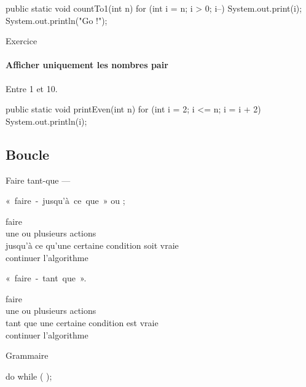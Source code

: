 \begin{frame}[fragile]
\begin{java}
public static void countTo1(int n) {
    for (int i = n; i > 0; i--) {
        System.out.print(i);
    }
    System.out.println("Go !");
}
\end{java}
\end{frame}

\begin{frame}[fragile]{Exercice}
  \framesubtitle{Afficher uniquement les nombres pair}
  Entre 1 et 10.

  \pause
  \begin{java}
public static void printEven(int n) {
    for (int i = 2; i <= n; i = i + 2) {
        System.out.println(i);
    }
}
  \end{java}
\end{frame}

\subsection{Boucle }
\begin{frame}{\og Faire tant-que \og --- }

  «~faire~-~jusqu'à~ce~que~» ou ;
  \begin{langagenaturel}
    faire\\
      \tab une ou plusieurs actions\\
    jusqu'à ce qu'une certaine condition soit vraie\\
    continuer l'algorithme 
  \end{langagenaturel}

  «~faire~-~tant~que~».
  \begin{langagenaturel}
    faire\\
      \tab une ou plusieurs actions\\
    tant que une certaine condition est vraie\\
    continuer l'algorithme 
  \end{langagenaturel}
\end{frame}

\begin{frame}[fragile]{Grammaire}
  \begin{grammaire}
      do 
      while (  );
  \end{grammaire}
\end{frame}

